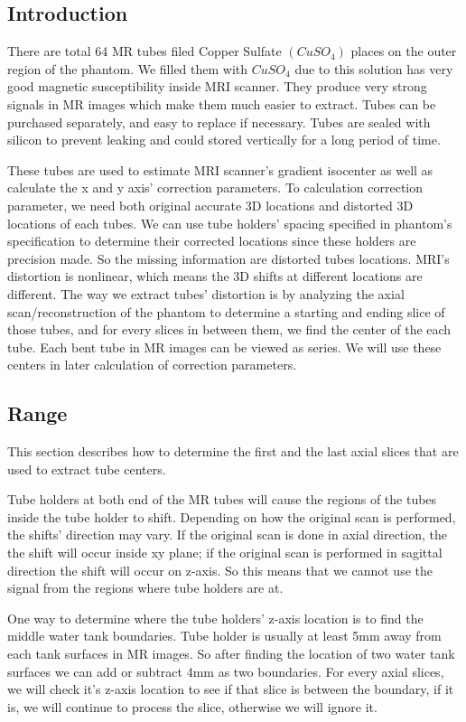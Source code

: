 \subsection{Introduction}
There are total 64 MR tubes filed Copper Sulfate $(CuSO_4)$ places on the outer region of the phantom.
We filled them with $CuSO_4$ due to this solution has very good magnetic susceptibility inside MRI scanner. 
They produce very strong signals in MR images which make them much easier to extract. Tubes can be purchased
separately, and easy to replace if necessary. Tubes are sealed with silicon to prevent leaking and could stored
vertically for a long period of time. 

These tubes are used to estimate MRI scanner's gradient isocenter as well as calculate the x and y axis' 
correction parameters. To calculation correction parameter, we need both original accurate 3D locations
and distorted 3D locations of each tubes. We can use tube holders' spacing specified in phantom's 
specification to determine their corrected locations since these holders are precision made. So the missing
information are distorted tubes locations. MRI's distortion is nonlinear, which means the 3D shifts at
different locations are different. The way we extract tubes' distortion is by analyzing the axial 
scan/reconstruction of the phantom to determine a starting and ending slice of those tubes, and for every
slices in between them, we find the center of the each tube. Each bent tube in MR images can be viewed as
series. We will use these centers in later calculation of correction parameters.

\subsection{Range}
This section describes how to determine the first and the last axial slices that are used to extract
tube centers.

Tube holders at both end of the MR tubes will cause the regions of the tubes inside the tube holder to shift. 
Depending on how the original scan is performed, the shifts' direction may vary. If the original scan is
done in axial direction, the the shift will occur inside xy plane; if the original scan is performed in
sagittal direction the shift will occur on z-axis. So this means that we cannot use the signal from the 
regions where tube holders are at. 

One way to determine where the tube holders' z-axis location is to find the middle water tank boundaries. 
Tube holder is usually at least 5mm away from each  tank surfaces in MR images. So after finding the location
of two water tank surfaces we can add or subtract 4mm as two boundaries. For every axial slices, we will
check it's z-axis location to see if that slice is between the boundary, if it is, we will continue to process
the slice, otherwise we will ignore it.

